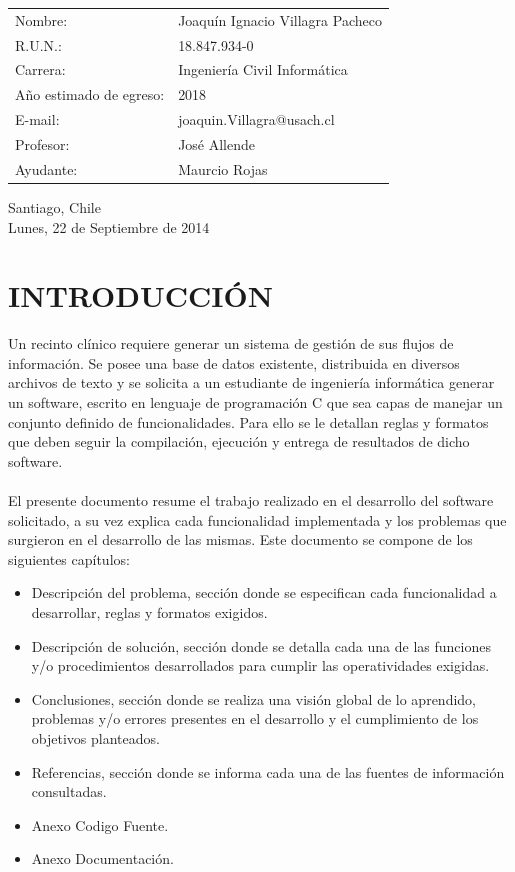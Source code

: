 \documentclass[12pt,letterpaper]{article}
\begin{document}
	\vspace{3cm}
	\begin{flushright}
		\begin{tabular}[t]{l l}
			Nombre: & Joaquín Ignacio Villagra Pacheco \\
			R.U.N.: & 18.847.934-0\\
			Carrera: & Ingeniería Civil Informática\\
			A\~no estimado de egreso: & 2018\\
			E-mail: & joaquin.Villagra@usach.cl\\
			Profesor: & José Allende\\
			Ayudante: & Maurcio Rojas

		\end{tabular}
	\end{flushright}
	\begin{center}
		\vspace{1.5cm}
		Santiago, Chile\\
		Lunes, 22 de Septiembre de 2014
	\end{center}



\newpage
\tableofcontents
\thispagestyle{empty}

\newpage
\renewcommand{\thepage}{\arabic{page}}
\setcounter{page}{1}

\section{INTRODUCCIÓN}
Un recinto clínico requiere generar un sistema de gestión de sus flujos de información. Se posee una base de datos existente, distribuida en diversos archivos de texto y se solicita a un estudiante de ingeniería informática generar un software, escrito en lenguaje de programación C que sea capas de manejar un conjunto definido de funcionalidades. Para ello se le detallan reglas y formatos que deben seguir la compilación, ejecución y entrega de resultados de dicho software.
\\
\\El presente documento resume el trabajo realizado en el desarrollo del software solicitado, a su vez explica cada funcionalidad implementada y los problemas que surgieron en el desarrollo de las mismas.  Este documento se compone de los siguientes capítulos:
\begin{itemize}
\item Descripción del problema, sección donde se especifican cada funcionalidad a desarrollar, reglas y formatos exigidos.
\item Descripción de solución, sección donde se detalla cada una de las funciones y/o procedimientos desarrollados para cumplir las operatividades exigidas.
\item Conclusiones, sección donde se realiza una visión global de lo aprendido, problemas y/o errores presentes en el desarrollo y el cumplimiento de los objetivos planteados.
\item Referencias, sección donde se informa cada una de las fuentes de información consultadas.
\item Anexo Codigo Fuente.
\item Anexo Documentación.
\end{itemize}
\end{document}
